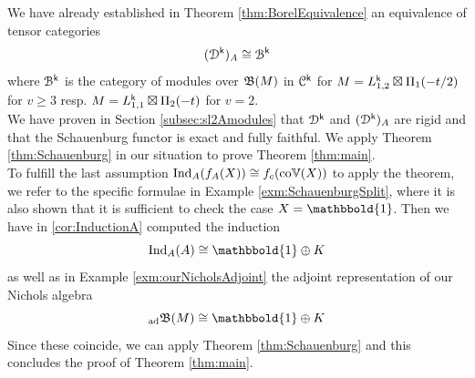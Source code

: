 \documentclass[a4paper, reqno]{amsart}
\theoremstyle{introTheorems}
\newcommand\cB{\mathcal{B}}
\newcommand\cC{\mathcal{C}}
\newcommand\cD{\mathcal{D}}
\newcommand{\Ind}{\textup{Ind}}
\renewcommand{\1}{\mathbbold{1}}
\begin{document}
We have already established in Theorem \ref{thm:BorelEquivalence} an equivalence of tensor categories 
$$(\cD^\k)_A\cong \cB^\k$$
where $\cB^\k$ is the  category of modules over $\mathfrak{B}(M)$ in $\cC^\k$ for $M=L^{\mathsf{k}}_{1,2}\boxtimes \Pi_{1}(-t/2)$ for $v\geq 3$ resp. $M=L^{\mathsf{k}}_{1,1}\boxtimes \Pi_{2}(-t)$ for $v=2$. \\

We have proven in Section \ref{subsec:sl2Amodules}
that $\mathcal{D}^{\mathsf{k}}$ and $(\mathcal{D}^{\mathsf{k}})_A$ are rigid and that the Schauenburg functor is exact and fully faithful.
We apply Theorem \ref{thm:Schauenburg} in our situation to prove Theorem \ref{thm:main}.\\

To fulfill the last assumption $\Ind_A(\forget_A(X))\cong \forget_c(\coLaugwitz(X))$ to apply the theorem, we refer to the specific formulae in Example \ref{exm:SchauenburgSplit}, where it is also shown that it is sufficient to check the case $X=\1$. Then  we have in \ref{cor:InductionA} computed the induction 
$$\Ind_A(A)\cong \1\oplus K$$
as well as in Example \ref{exm:ourNicholsAdjoint} the adjoint representation of our Nichols algebra  
$${_{\text{ad}}}\NicholsOf(M)\cong \1\oplus K$$
Since these coincide, we can apply Theorem \ref{thm:Schauenburg} and this concludes the proof of Theorem \ref{thm:main}.\flushright \qedsymbol
\end{document}
